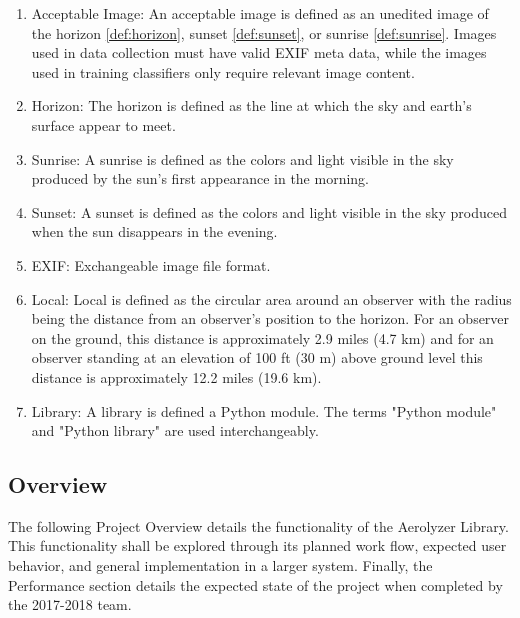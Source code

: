 \documentclass[journal,10pt,draftclsnofoot,onecolumn]{IEEEtran}
\begin{document}
\begin{singlespace}
\begin{enumerate}
			\item \label{def:accImg} Acceptable Image:
			An acceptable image is defined as an unedited image of the horizon \ref{def:horizon}, sunset \ref{def:sunset}, or sunrise \ref{def:sunrise}.
			Images used in data collection must have valid EXIF meta data, while the images used in training classifiers only require relevant image content.

			\item \label{def:horizon} Horizon:
			The horizon is defined as the line at which the sky and earth's surface appear to meet.

			\item \label{def:sunrise} Sunrise:
			A sunrise is defined as the colors and light visible in the sky produced by the sun's first appearance in the morning.

			\item \label{def:sunset} Sunset:
			A sunset is defined as the colors and light visible in the sky produced when the sun disappears in the evening.

			\item \label{def:exif} EXIF:
			Exchangeable image file format.

			\item \label{def:local} Local:
			Local is defined as the circular area around an observer with the radius being the distance from an observer's position to the horizon.
			For an observer on the ground, this distance is approximately 2.9 miles (4.7 km) and for an observer standing at an elevation of 100 ft (30 m) above ground level this distance is approximately 12.2 miles (19.6 km).

			\item \label{def:lib} Library:
			A library is defined a Python module. The terms "Python module" and "Python library" are used interchangeably.
		\end{enumerate}

	\nocite{*}
	
	

	\subsection{Overview}
		The following Project Overview details the functionality of the Aerolyzer Library.
		This functionality shall be explored through its planned work flow, expected user behavior, and general implementation in a larger system.
		Finally, the Performance section details the expected state of the project when completed by the 2017-2018 team.


\end{singlespace}
\end{document}
